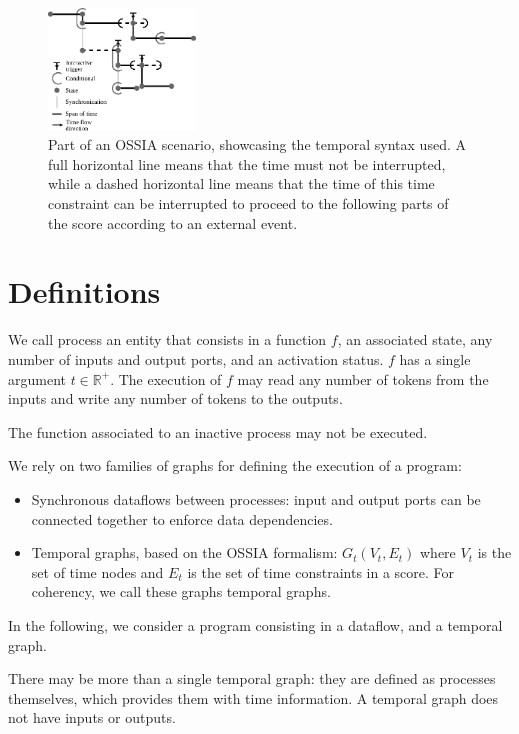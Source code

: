 \documentclass{article}
\begin{document}
\begin{figure}[h]
  \centering
  \includegraphics[width=0.35\textwidth]{images/iscore-example.eps}
  \caption{Part of an OSSIA scenario, showcasing the temporal syntax used. 
    A full horizontal line means that the time must not be interrupted, 
    while a dashed horizontal line means that the time of this time constraint can be interrupted to proceed 
  to the following parts of the score according to an external event.}
  \label{fig.iscore-example}
\end{figure}
    
\section{Definitions}
We call process an entity that consists in a function $f$, an associated state, any number of inputs and output ports, and an activation status.
$f$ has a single argument $t \in \mathbb{R^+}$.
The execution of $f$ may read any number of tokens from the inputs and write any number of tokens to the outputs.
    
The function associated to an inactive process may not be executed.

We rely on two families of graphs for defining the execution of a program:
    
\begin{itemize}
  \item Synchronous dataflows between processes: input and output ports can be connected together to enforce data dependencies.
  \item Temporal graphs, based on the OSSIA formalism: $G_t(V_t, E_t)$ where $V_t$ is the set of time nodes and $E_t$ is the set of time constraints in a score. 
  For coherency, we call these graphs temporal graphs.
\end{itemize}

In the following, we consider a program consisting in a dataflow, and a temporal graph.
    
There may be more than a single temporal graph: they are defined as processes themselves, which provides them with time information.
A temporal graph does not have inputs or outputs.
    
\end{document}
